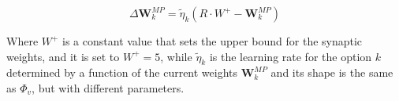 \begin{equation}
    \Delta \textbf{W}^{MP}_{k} = \tilde{\eta}_{k} \left(R\cdot W^{+}- \textbf{W}^{MP}_{k}\right)
\end{equation}

\noindent
Where $W^{+}$ is a constant value that sets the upper bound for the synaptic weights, and it is set to $W^{+} = 5$, while $\tilde{\eta}_{k}$ is the learning rate for the option $k$ determined by a function of the current weights $\textbf{W}^{MP}_{k}$ and its shape is the same as $\Phi_{v}$, but with
different parameters.


